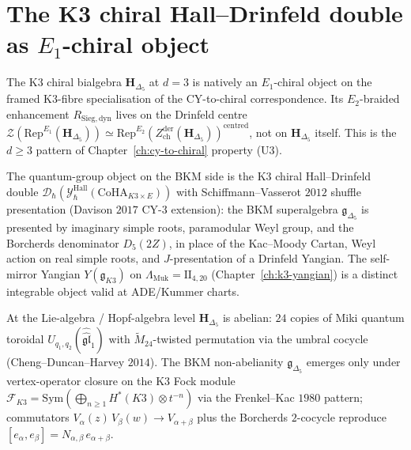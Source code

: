 \section{The K3 chiral Hall--Drinfeld double as \texorpdfstring{$E_1$}{E-1}-chiral object}
\label{sec:e1-k3-hall-drinfeld-E1-native}

\begin{remark}[\texorpdfstring{$E_1$}{E-1}-native at \texorpdfstring{$d=3$}{d=3}; \texorpdfstring{$E_2$}{E-2} on Drinfeld centre]
\label{rem:e1-native-level}
The K3 chiral bialgebra $\mathbf{H}_{\Delta_5}$ at $d=3$ is natively an $E_1$-chiral object on the framed K3-fibre specialisation of the CY-to-chiral correspondence. Its $E_2$-braided enhancement $R_{\mathrm{Sieg,dyn}}$ lives on the Drinfeld centre $\mathcal{Z}(\mathrm{Rep}^{E_1}(\mathbf{H}_{\Delta_5}))\simeq\mathrm{Rep}^{E_2}(Z^{\mathrm{der}}_{\mathrm{ch}}(\mathbf{H}_{\Delta_5}))^{\mathrm{centred}}$, not on $\mathbf{H}_{\Delta_5}$ itself. This is the $d\geq 3$ pattern of Chapter~\ref{ch:cy-to-chiral} property (U3).
\end{remark}

\begin{remark}
\label{rem:e1-hall-drinfeld}
The quantum-group object on the BKM side is the K3 chiral Hall--Drinfeld double $\mathcal{D}_\hbar(\mathcal{Y}^{\mathrm{Hall}}_\hbar(\mathrm{CoHA}_{K3\times E}))$ with Schiffmann--Vasserot $2012$ shuffle presentation (Davison $2017$ CY-$3$ extension): the BKM superalgebra $\mathfrak{g}_{\Delta_5}$ is presented by imaginary simple roots, paramodular Weyl group, and the Borcherds denominator $D_5(2Z)$, in place of the Kac--Moody Cartan, Weyl action on real simple roots, and $J$-presentation of a Drinfeld Yangian. The self-mirror Yangian $Y(\mathfrak{g}_{K3})$ on $\Lambda_{\mathrm{Muk}}=\mathrm{II}_{4,20}$ (Chapter~\ref{ch:k3-yangian}) is a distinct integrable object valid at ADE/Kummer charts.
\end{remark}

\begin{remark}
\label{rem:e1-abelian-at-lie}
At the Lie-algebra / Hopf-algebra level $\mathbf{H}_{\Delta_5}$ is abelian: $24$ copies of Miki quantum toroidal $U_{q_1,q_2}(\widehat{\widehat{\mathfrak{gl}}}_1)$ with $\widetilde{M}_{24}$-twisted permutation via the umbral cocycle (Cheng--Duncan--Harvey $2014$). The BKM non-abelianity $\mathfrak{g}_{\Delta_5}$ emerges only under vertex-operator closure on the K3 Fock module $\mathcal{F}_{K3}=\mathrm{Sym}(\bigoplus_{n\ge 1}H^*(K3)\otimes t^{-n})$ via the Frenkel--Kac $1980$ pattern; commutators $V_\alpha(z)\,V_\beta(w)\to V_{\alpha+\beta}$ plus the Borcherds $2$-cocycle reproduce $[e_\alpha,e_\beta]=N_{\alpha,\beta}\,e_{\alpha+\beta}$.
\end{remark}

